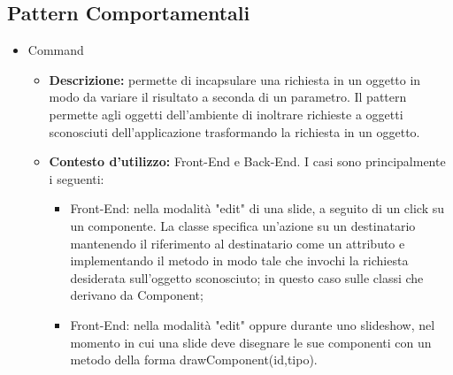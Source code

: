 \subsection{Pattern Comportamentali}
\begin{itemize}
	\item Command
	\begin{itemize}
		\item \textbf{Descrizione:} permette di incapsulare una richiesta in un oggetto in modo da variare il risultato a seconda di un parametro. Il pattern permette agli oggetti dell'ambiente di inoltrare richieste a oggetti sconosciuti dell'applicazione trasformando la richiesta in un oggetto.
		\item \textbf{Contesto d'utilizzo:} \gls{Front-End} e \gls{Back-End}. I casi sono principalmente i seguenti:
		\begin{itemize}
			\item \gls{Front-End}: nella modalità "edit" di una \gls{slide}, a seguito di un click su un componente. La classe specifica un'azione su un destinatario mantenendo il riferimento al destinatario come un attributo e implementando il metodo in modo tale che invochi la richiesta desiderata sull'oggetto sconosciuto; in questo caso sulle classi che derivano da Component;
			\item \gls{Front-End}: nella modalità "edit" oppure durante uno slideshow, nel momento in cui una \gls{slide} deve disegnare le sue componenti con un metodo della forma drawComponent(id,tipo).
		\end{itemize}
	\end{itemize}
\end{itemize}


